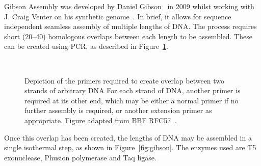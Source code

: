 \documentclass[../main.tex]{subfiles}
\begin{document}
Gibson Assembly was developed by Daniel Gibson~\citep{gibson09} in 2009 whilst working with J. Craig Venter on his synthetic genome~\citep{venter10}. In brief, it allows for sequence independent seamless assembly of multiple lengths of DNA. The process requires short (\SIrange{20}{40}{\base}) homologous overlaps between each length to be assembled. These can be created using PCR, as described in Figure~\ref{fig:gibsonPCR}.
\begin{figure}[p]
\\
\caption[Primer design for Gibson Assembly]{Depiction of the primers required to create overlap between two strands of arbitrary DNA For each strand of DNA, another primer is required at its other end, which may be either a normal primer if no further assembly is required, or another extension primer as appropriate. Figure adapted from BBF RFC57~\citep{rfc57}.}
\label{fig:gibsonPCR}
\end{figure}

Once this overlap has been created, the lengths of DNA may be assembled in a single isothermal step, as shown in Figure~\ref{fig:gibson}. The enzymes used are T5 exonuclease, Phusion\textregistered\xspace polymerase and Taq ligase. 
\end{document}
